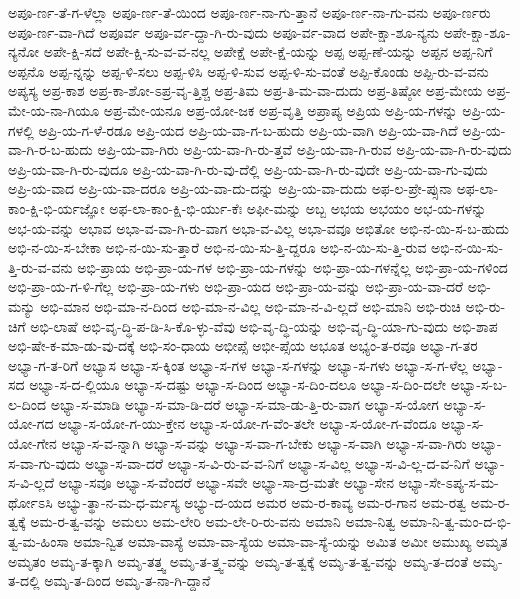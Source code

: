 {ಅಪೂ-ರ್ಣ-ತೆ-ಗ-ಳೆಲ್ಲಾ
ಅಪೂ-ರ್ಣ-ತೆ-ಯಿಂದ
ಅಪೂ-ರ್ಣ-ನಾ-ಗು-ತ್ತಾನೆ
ಅಪೂ-ರ್ಣ-ನಾ-ಗು-ವನು
ಅಪೂ-ರ್ಣರು
ಅಪೂ-ರ್ಣ-ವಾ-ಗಿದೆ
ಅಪೂರ್ವ
ಅಪೂ-ರ್ವ-ದ್ದಾ-ಗಿ-ರು-ವುದು
ಅಪೂ-ರ್ವ-ವಾದ
ಅಪೇ-ಕ್ಷಾ-ಶೂ-ನ್ಯನು
ಅಪೇ-ಕ್ಷಾ-ಶೂ-ನ್ಯನೋ
ಅಪೇ-ಕ್ಷಿ-ಸದೆ
ಅಪೇ-ಕ್ಷಿ-ಸು-ವ-ವ-ನಲ್ಲ
ಅಪೇಕ್ಷೆ
ಅಪೇ-ಕ್ಷೆ-ಯನ್ನು
ಅಪ್ಪ
ಅಪ್ಪ-ಣೆ-ಯನ್ನು
ಅಪ್ಪನ
ಅಪ್ಪ-ನಿಗೆ
ಅಪ್ಪನೊ
ಅಪ್ಪ-ನ್ನನ್ನು
ಅಪ್ಪ-ಳಿ-ಸಲು
ಅಪ್ಪ-ಳಿಸಿ
ಅಪ್ಪ-ಳಿ-ಸುವ
ಅಪ್ಪ-ಳಿ-ಸು-ವಂತೆ
ಅಪ್ಪಿ-ಕೊಂಡು
ಅಪ್ಪಿ-ರು-ವ-ವನು
ಅಪ್ಯಸ್ಯ
ಅಪ್ರ-ಕಾಶ
ಅಪ್ರ-ಕಾ-ಶೋ-ಽಪ್ರ-ವೃ-ತ್ತಿಶ್ಚ
ಅಪ್ರ-ತಿಮ
ಅಪ್ರ-ತಿ-ಮ-ವಾ-ದುದು
ಅಪ್ರ-ತಿಷ್ಠೋ
ಅಪ್ರ-ಮೇಯ
ಅಪ್ರ-ಮೇ-ಯ-ನಾ-ಗಿಯೂ
ಅಪ್ರ-ಮೇ-ಯನೂ
ಅಪ್ರ-ಯೋ-ಜಕ
ಅಪ್ರ-ವೃತ್ತಿ
ಅಪ್ರಾಪ್ಯ
ಅಪ್ರಿಯ
ಅಪ್ರಿ-ಯ-ಗಳನ್ನು
ಅಪ್ರಿ-ಯ-ಗಳಲ್ಲಿ
ಅಪ್ರಿ-ಯ-ಗ-ಳೆ-ರಡೂ
ಅಪ್ರಿ-ಯದ
ಅಪ್ರಿ-ಯ-ವಾ-ಗ-ಬ-ಹುದು
ಅಪ್ರಿ-ಯ-ವಾಗಿ
ಅಪ್ರಿ-ಯ-ವಾ-ಗಿದೆ
ಅಪ್ರಿ-ಯ-ವಾ-ಗಿ-ರ-ಬ-ಹುದು
ಅಪ್ರಿ-ಯ-ವಾ-ಗಿರು
ಅಪ್ರಿ-ಯ-ವಾ-ಗಿ-ರು-ತ್ತವೆ
ಅಪ್ರಿ-ಯ-ವಾ-ಗಿ-ರುವ
ಅಪ್ರಿ-ಯ-ವಾ-ಗಿ-ರು-ವುದು
ಅಪ್ರಿ-ಯ-ವಾ-ಗಿ-ರು-ವುದೂ
ಅಪ್ರಿ-ಯ-ವಾ-ಗಿ-ರು-ವು-ದೆಲ್ಲಿ
ಅಪ್ರಿ-ಯ-ವಾ-ಗಿ-ರು-ವುದೇ
ಅಪ್ರಿ-ಯ-ವಾ-ಗು-ವುದು
ಅಪ್ರಿ-ಯ-ವಾದ
ಅಪ್ರಿ-ಯ-ವಾ-ದರೂ
ಅಪ್ರಿ-ಯ-ವಾ-ದು-ದನ್ನು
ಅಪ್ರಿ-ಯ-ವಾ-ದುದು
ಅಫ-ಲ-ಪ್ರೇ-ಪ್ಸುನಾ
ಅಫ-ಲಾ-ಕಾಂ-ಕ್ಷಿ-ಭಿ-ರ್ಯಜ್ಞೋ
ಅಫ-ಲಾ-ಕಾಂ-ಕ್ಷಿ-ಭಿ-ರ್ಯು-ಕೆಃ
ಅಫೀ-ಮನ್ನು
ಅಬ್ಬ
ಅಭಯ
ಅಭಯಂ
ಅಭ-ಯ-ಗಳನ್ನು
ಅಭ-ಯ-ವನ್ನು
ಅಭಾವ
ಅಭಾ-ವ-ವಾ-ಗಿ-ರು-ವಾಗ
ಅಭಾ-ವ-ವಿಲ್ಲ
ಅಭಾ-ವವೂ
ಅಭಿತೋ
ಅಭಿ-ನ-ಯಿ-ಸ-ಬ-ಹುದು
ಅಭಿ-ನ-ಯಿ-ಸ-ಬೇಕಾ
ಅಭಿ-ನ-ಯಿ-ಸು-ತ್ತಾರೆ
ಅಭಿ-ನ-ಯಿ-ಸು-ತ್ತಿ-ದ್ದರೂ
ಅಭಿ-ನ-ಯಿ-ಸು-ತ್ತಿ-ರುವ
ಅಭಿ-ನ-ಯಿ-ಸು-ತ್ತಿ-ರು-ವ-ವನು
ಅಭಿ-ಪ್ರಾಯ
ಅಭಿ-ಪ್ರಾ-ಯ-ಗಳ
ಅಭಿ-ಪ್ರಾ-ಯ-ಗಳನ್ನು
ಅಭಿ-ಪ್ರಾ-ಯ-ಗಳನ್ನೆಲ್ಲ
ಅಭಿ-ಪ್ರಾ-ಯ-ಗಳಿಂದ
ಅಭಿ-ಪ್ರಾ-ಯ-ಗ-ಳಿ-ಗೆಲ್ಲ
ಅಭಿ-ಪ್ರಾ-ಯ-ಗಳು
ಅಭಿ-ಪ್ರಾ-ಯದ
ಅಭಿ-ಪ್ರಾ-ಯ-ವನ್ನು
ಅಭಿ-ಪ್ರಾ-ಯ-ವಾ-ದರೆ
ಅಭಿ-ಮನ್ಯು
ಅಭಿ-ಮಾನ
ಅಭಿ-ಮಾ-ನ-ದಿಂದ
ಅಭಿ-ಮಾ-ನ-ವಿಲ್ಲ
ಅಭಿ-ಮಾ-ನ-ವಿ-ಲ್ಲದೆ
ಅಭಿ-ಮಾನಿ
ಅಭಿ-ರುಚಿ
ಅಭಿ-ರು-ಚಿಗೆ
ಅಭಿ-ಲಾಷೆ
ಅಭಿ-ವೃ-ದ್ಧಿ-ಪ-ಡಿ-ಸಿ-ಕೊ-ಳ್ಳು-ವೆವು
ಅಭಿ-ವೃ-ದ್ಧಿ-ಯನ್ನು
ಅಭಿ-ವೃ-ದ್ಧಿ-ಯಾ-ಗು-ವುದು
ಅಭಿ-ಶಾಪ
ಅಭಿ-ಷೇ-ಕ-ಮಾ-ಡು-ವು-ದಕ್ಕೆ
ಅಭಿ-ಸಂ-ಧಾಯ
ಅಭೀಪ್ಸೆ
ಅಭೀ-ಪ್ಸೆಯ
ಅಭೂತ
ಅಭ್ಯಂ-ತ-ರವೂ
ಅಭ್ಯಾ-ಗ-ತರ
ಅಭ್ಯಾ-ಗ-ತ-ರಿಗೆ
ಅಭ್ಯಾಸ
ಅಭ್ಯಾ-ಸ-ಕ್ಕಿಂತ
ಅಭ್ಯಾ-ಸ-ಗಳ
ಅಭ್ಯಾ-ಸ-ಗಳನ್ನು
ಅಭ್ಯಾ-ಸ-ಗಳು
ಅಭ್ಯಾ-ಸ-ಗ-ಳೆಲ್ಲ
ಅಭ್ಯಾ-ಸದ
ಅಭ್ಯಾ-ಸ-ದ-ಲ್ಲಿಯೂ
ಅಭ್ಯಾ-ಸ-ದಷ್ಟು
ಅಭ್ಯಾ-ಸ-ದಿಂದ
ಅಭ್ಯಾ-ಸ-ದಿಂ-ದಲೂ
ಅಭ್ಯಾ-ಸ-ದಿಂ-ದಲೇ
ಅಭ್ಯಾ-ಸ-ಬ-ಲ-ದಿಂದ
ಅಭ್ಯಾ-ಸ-ಮಾಡಿ
ಅಭ್ಯಾ-ಸ-ಮಾ-ಡಿ-ದರೆ
ಅಭ್ಯಾ-ಸ-ಮಾ-ಡು-ತ್ತಿ-ರು-ವಾಗ
ಅಭ್ಯಾ-ಸ-ಯೋಗ
ಅಭ್ಯಾ-ಸ-ಯೋ-ಗದ
ಅಭ್ಯಾ-ಸ-ಯೋ-ಗ-ಯು-ಕ್ತೇನ
ಅಭ್ಯಾ-ಸ-ಯೋ-ಗ-ವೆಂ-ತಲೇ
ಅಭ್ಯಾ-ಸ-ಯೋ-ಗ-ವೆಂದೂ
ಅಭ್ಯಾ-ಸ-ಯೋ-ಗೇನ
ಅಭ್ಯಾ-ಸ-ವ-ನ್ನಾಗಿ
ಅಭ್ಯಾ-ಸ-ವನ್ನು
ಅಭ್ಯಾ-ಸ-ವಾ-ಗ-ಬೇಕು
ಅಭ್ಯಾ-ಸ-ವಾಗಿ
ಅಭ್ಯಾ-ಸ-ವಾ-ಗಿರು
ಅಭ್ಯಾ-ಸ-ವಾ-ಗು-ವುದು
ಅಭ್ಯಾ-ಸ-ವಾ-ದರೆ
ಅಭ್ಯಾ-ಸ-ವಿ-ರು-ವ-ವ-ನಿಗೆ
ಅಭ್ಯಾ-ಸ-ವಿಲ್ಲ
ಅಭ್ಯಾ-ಸ-ವಿ-ಲ್ಲ-ದ-ವ-ನಿಗೆ
ಅಭ್ಯಾ-ಸ-ವಿ-ಲ್ಲದೆ
ಅಭ್ಯಾ-ಸವೂ
ಅಭ್ಯಾ-ಸ-ವೆಂದರೆ
ಅಭ್ಯಾ-ಸವೇ
ಅಭ್ಯಾ-ಸಾ-ದ್ರ-ಮತೇ
ಅಭ್ಯಾ-ಸೇನ
ಅಭ್ಯಾ-ಸೇ-ಽಪ್ಯ-ಸ-ಮ-ರ್ಥೋಽಸಿ
ಅಭ್ಯು-ತ್ಥಾ-ನ-ಮ-ಧ-ರ್ಮಸ್ಯ
ಅಭ್ಯು-ದ-ಯದ
ಅಮರ
ಅಮ-ರ-ಕಾವ್ಯ
ಅಮ-ರ-ಗಾನ
ಅಮ-ರತ್ವ
ಅಮ-ರ-ತ್ವಕ್ಕೆ
ಅಮ-ರ-ತ್ವ-ವನ್ನು
ಅಮಲು
ಅಮ-ಲೇರಿ
ಅಮ-ಲೇ-ರಿ-ರು-ವನು
ಅಮಾನಿ
ಅಮಾ-ನಿತ್ವ
ಅಮಾ-ನಿ-ತ್ವ-ಮಂ-ದ-ಭಿ-ತ್ವ-ಮ-ಹಿಂಸಾ
ಅಮಾ-ನ್ವಿತ
ಅಮಾ-ವಾಸ್ಯೆ
ಅಮಾ-ವಾ-ಸ್ಯೆಯ
ಅಮಾ-ವಾ-ಸ್ಯೆ-ಯನ್ನು
ಅಮಿತ
ಅಮೀ
ಅಮುಖ್ಯ
ಅಮೃತ
ಅಮೃತಂ
ಅಮೃ-ತ-ಕ್ಕಾಗಿ
ಅಮೃ-ತತ್ತ್ವ
ಅಮೃ-ತ-ತ್ತ್ವ-ವನ್ನು
ಅಮೃ-ತ-ತ್ವಕ್ಕೆ
ಅಮೃ-ತ-ತ್ವ-ವನ್ನು
ಅಮೃ-ತ-ದಂತೆ
ಅಮೃ-ತ-ದಲ್ಲಿ
ಅಮೃ-ತ-ದಿಂದ
ಅಮೃ-ತ-ನಾ-ಗಿ-ದ್ದಾನೆ
}
